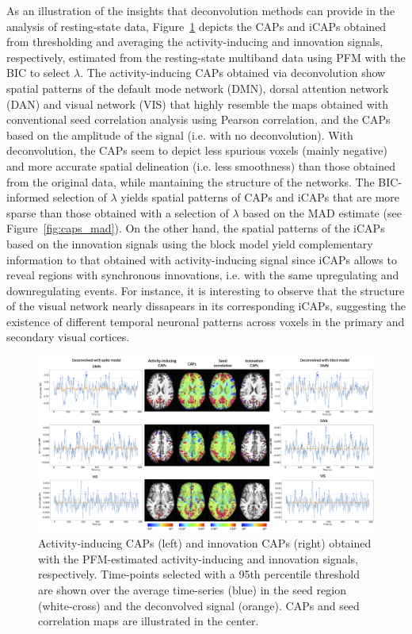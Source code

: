 As an illustration of the insights that deconvolution methods can provide in the analysis of resting-state data, Figure~\ref{fig:caps} depicts the CAPs and iCAPs obtained from thresholding and averaging the activity-inducing and innovation signals, respectively, estimated from the resting-state multiband data using PFM with the BIC to select $\lambda$. The activity-inducing CAPs obtained via deconvolution show spatial patterns of the default mode network (DMN), dorsal attention network (DAN) and visual network (VIS) that highly resemble the maps obtained with conventional seed correlation analysis using Pearson correlation, and the CAPs based on the amplitude of the signal (i.e. with no deconvolution). With deconvolution, the CAPs seem to depict less spurious voxels (mainly negative) and more accurate spatial delineation (i.e. less smoothness) than those obtained from the original data, while mantaining the structure of the networks. The BIC-informed selection of $\lambda$ yields spatial patterns of CAPs and iCAPs that are more sparse than those obtained with a selection of $\lambda$ based on the MAD estimate (see Figure~\ref{fig:caps_mad}). On the other hand, the spatial patterns of the iCAPs based on the innovation signals using the block model yield complementary information to that obtained with activity-inducing signal since iCAPs allows to reveal regions with synchronous innovations, i.e. with the same upregulating and downregulating events. For instance, it is interesting to observe that the structure of the visual network nearly dissapears in its corresponding iCAPs, suggesting the existence of different temporal neuronal patterns across voxels in the primary and secondary visual cortices. 

\begin{figure}[t!]
    \begin{center}
        \includegraphics[width=\textwidth]{figures/caps.png}
    \end{center}
    \caption{Activity-inducing CAPs (left) and innovation CAPs (right) obtained with the PFM-estimated activity-inducing and innovation signals, respectively. Time-points selected with a 95th percentile threshold are shown over the average time-series (blue) in the seed region (white-cross) and the deconvolved signal (orange). CAPs and seed correlation maps are illustrated in the center.}
\label{fig:caps}
\end{figure}

